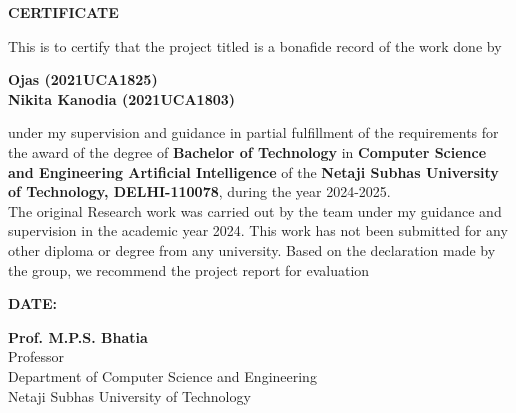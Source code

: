 \thispagestyle{plain}
\begin{center}
\large \large \textbf{CERTIFICATE}
\end{center}

\vspace{0.3cm}
\fontsize{12pt}{24pt}\selectfont This is to certify that the project titled \textbf{\btptitle} is a bonafide record of the work done by
\vspace{1.0cm}

\begin{center}
\textbf{Ojas (2021UCA1825)\\Nikita Kanodia (2021UCA1803)}
\end{center}

\vspace{1.0cm}
\noindent
\fontsize{12pt}{24pt}\selectfont under my supervision and guidance in partial fulfillment of the requirements for the award of the degree of \textbf{Bachelor of Technology} in \textbf{Computer Science and Engineering Artificial Intelligence} of the \textbf{Netaji Subhas University of Technology, DELHI-110078}, during the year 2024-2025.\\ \indent  The original Research work was carried out by the team under my guidance and supervision in the academic year 2024. This work has not been submitted for any other
 diploma or degree from any university. Based on the declaration made by the group, we
 recommend the project report for evaluation

\vspace{2.5cm}
\textbf{DATE: }
\begin{flushright}
\vspace{2.5cm}
 \textbf{Prof. M.P.S. Bhatia} \\
 Professor\\
 Department of Computer Science and Engineering\\
 Netaji Subhas University of Technology

\end{flushright}






\newpage